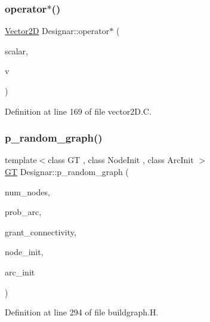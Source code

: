 \subsubsection{\texorpdfstring{operator$\ast$()}{operator*()}}
{\footnotesize\ttfamily \hyperlink{class_designar_1_1_vector2_d}{Vector2D} Designar\+::operator$\ast$ (\begin{DoxyParamCaption}\item[{\hyperlink{namespace_designar_aca2c32af26808dbec1f3a3071fad25ce}{real\+\_\+t}}]{scalar,  }\item[{const \hyperlink{class_designar_1_1_vector2_d}{Vector2D} \&}]{v }\end{DoxyParamCaption})}



Definition at line 169 of file vector2\+D.\+C.

\mbox{\label{namespace_designar_ad69b4cdb00633579b1ed7b47bd8dc00a}} 
\subsubsection{\texorpdfstring{p\+\_\+random\+\_\+graph()}{p\_random\_graph()}\hspace{0.1cm}{\footnotesize\ttfamily [1/2]}}
{\footnotesize\ttfamily template$<$class GT , class Node\+Init , class Arc\+Init $>$ \\
\hyperlink{demo-buildgraph_8_c_a3001c40d2c31ca87ed96cd7d1334a55e}{GT} Designar\+::p\+\_\+random\+\_\+graph (\begin{DoxyParamCaption}\item[{\hyperlink{namespace_designar_aa72662848b9f4815e7bf31a7cf3e33d1}{nat\+\_\+t}}]{num\+\_\+nodes,  }\item[{\hyperlink{namespace_designar_aca2c32af26808dbec1f3a3071fad25ce}{real\+\_\+t}}]{prob\+\_\+arc,  }\item[{bool}]{grant\+\_\+connectivity,  }\item[{Node\+Init \&}]{node\+\_\+init,  }\item[{Arc\+Init \&}]{arc\+\_\+init }\end{DoxyParamCaption})}



Definition at line 294 of file buildgraph.\+H.

\mbox{\label{namespace_designar_a55d69e396be9526992246c78526d7c36}} 
